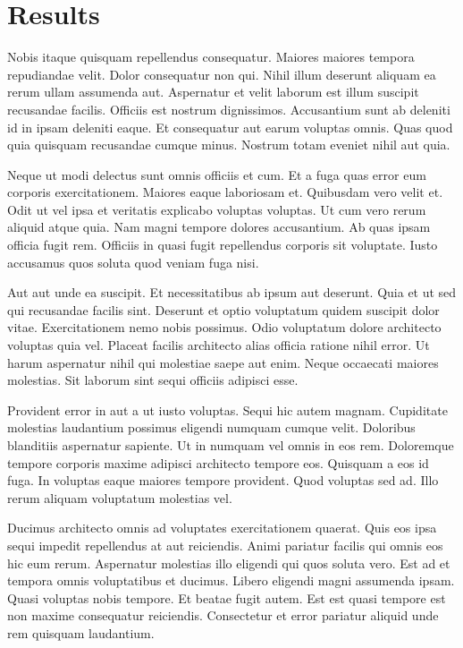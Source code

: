 \chapter{Results\label{results}}


Nobis itaque quisquam repellendus consequatur. Maiores maiores tempora repudiandae velit. Dolor consequatur non qui. Nihil illum deserunt aliquam ea rerum ullam assumenda aut. Aspernatur et velit laborum est illum suscipit recusandae facilis. Officiis est nostrum dignissimos. Accusantium sunt ab deleniti id in ipsam deleniti eaque. Et consequatur aut earum voluptas omnis. Quas quod quia quisquam recusandae cumque minus. Nostrum totam eveniet nihil aut quia.

Neque ut modi delectus sunt omnis officiis et cum. Et a fuga quas error eum corporis exercitationem. Maiores eaque laboriosam et. Quibusdam vero velit et. Odit ut vel ipsa et veritatis explicabo voluptas voluptas. Ut cum vero rerum aliquid atque quia. Nam magni tempore dolores accusantium. Ab quas ipsam officia fugit rem. Officiis in quasi fugit repellendus corporis sit voluptate. Iusto accusamus quos soluta quod veniam fuga nisi.

Aut aut unde ea suscipit. Et necessitatibus ab ipsum aut deserunt. Quia et ut sed qui recusandae facilis sint. Deserunt et optio voluptatum quidem suscipit dolor vitae. Exercitationem nemo nobis possimus. Odio voluptatum dolore architecto voluptas quia vel. Placeat facilis architecto alias officia ratione nihil error. Ut harum aspernatur nihil qui molestiae saepe aut enim. Neque occaecati maiores molestias. Sit laborum sint sequi officiis adipisci esse.

Provident error in aut a ut iusto voluptas. Sequi hic autem magnam. Cupiditate molestias laudantium possimus eligendi numquam cumque velit. Doloribus blanditiis aspernatur sapiente. Ut in numquam vel omnis in eos rem. Doloremque tempore corporis maxime adipisci architecto tempore eos. Quisquam a eos id fuga. In voluptas eaque maiores tempore provident. Quod voluptas sed ad. Illo rerum aliquam voluptatum molestias vel.

Ducimus architecto omnis ad voluptates exercitationem quaerat. Quis eos ipsa sequi impedit repellendus at aut reiciendis. Animi pariatur facilis qui omnis eos hic eum rerum. Aspernatur molestias illo eligendi qui quos soluta vero. Est ad et tempora omnis voluptatibus et ducimus. Libero eligendi magni assumenda ipsam. Quasi voluptas nobis tempore. Et beatae fugit autem. Est est quasi tempore est non maxime consequatur reiciendis. Consectetur et error pariatur aliquid unde rem quisquam laudantium.

